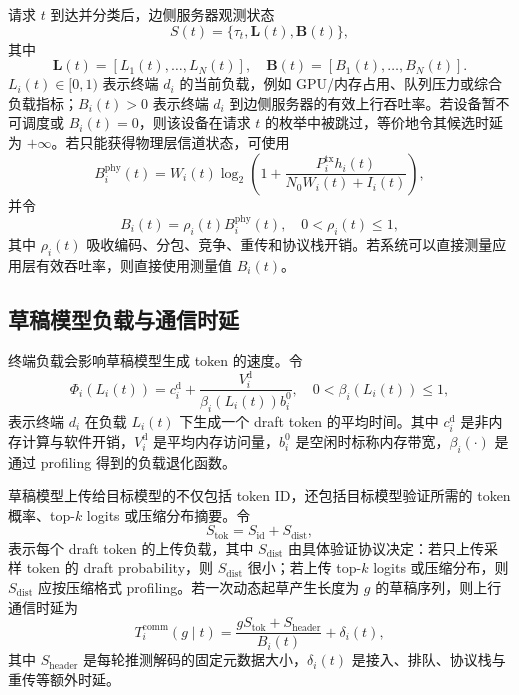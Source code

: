 \documentclass[11pt,a4paper]{ctexart}
\begin{document}
请求 $t$ 到达并分类后，边侧服务器观测状态
\begin{equation}
    S(t)=\{\tau_t,\mathbf{L}(t),\mathbf{B}(t)\},
\end{equation}
其中
\begin{equation}
    \mathbf{L}(t)=[L_1(t),\ldots,L_N(t)],
    \quad
    \mathbf{B}(t)=[B_1(t),\ldots,B_N(t)].
\end{equation}
$L_i(t)\in[0,1)$ 表示终端 $d_i$ 的当前负载，例如 GPU/内存占用、队列压力或综合负载指标；$B_i(t)>0$ 表示终端 $d_i$ 到边侧服务器的有效上行吞吐率。若设备暂不可调度或 $B_i(t)=0$，则该设备在请求 $t$ 的枚举中被跳过，等价地令其候选时延为 $+\infty$。若只能获得物理层信道状态，可使用
\begin{equation}
    B_i^{\mathrm{phy}}(t)
    =
    W_i(t)\log_2
    \left(
    1+
    \frac{P_i^{\mathrm{tx}}h_i(t)}
    {N_0W_i(t)+I_i(t)}
    \right),
\end{equation}
并令
\begin{equation}
    B_i(t)=\rho_i(t)B_i^{\mathrm{phy}}(t),
    \quad 0<\rho_i(t)\leq 1,
\end{equation}
其中 $\rho_i(t)$ 吸收编码、分包、竞争、重传和协议栈开销。若系统可以直接测量应用层有效吞吐率，则直接使用测量值 $B_i(t)$。

\subsection{草稿模型负载与通信时延}
\label{subsec:latency}

终端负载会影响草稿模型生成 token 的速度。令
\begin{equation}
    \Phi_i(L_i(t))
    =
    c_i^{\mathrm{d}}
    +
    \frac{V_i^{\mathrm{d}}}{\beta_i(L_i(t))b_i^0},
    \quad
    0<\beta_i(L_i(t))\leq 1,
    \label{eq:draft_token_latency}
\end{equation}
表示终端 $d_i$ 在负载 $L_i(t)$ 下生成一个 draft token 的平均时间。其中 $c_i^{\mathrm{d}}$ 是非内存计算与软件开销，$V_i^{\mathrm{d}}$ 是平均内存访问量，$b_i^0$ 是空闲时标称内存带宽，$\beta_i(\cdot)$ 是通过 profiling 得到的负载退化函数。

草稿模型上传给目标模型的不仅包括 token ID，还包括目标模型验证所需的 token 概率、top-$k$ logits 或压缩分布摘要。令
\begin{equation}
    S_{\mathrm{tok}}=S_{\mathrm{id}}+S_{\mathrm{dist}},
\end{equation}
表示每个 draft token 的上传负载，其中 $S_{\mathrm{dist}}$ 由具体验证协议决定：若只上传采样 token 的 draft probability，则 $S_{\mathrm{dist}}$ 很小；若上传 top-$k$ logits 或压缩分布，则 $S_{\mathrm{dist}}$ 应按压缩格式 profiling。若一次动态起草产生长度为 $g$ 的草稿序列，则上行通信时延为
\begin{equation}
    T_i^{\mathrm{comm}}(g\mid t)
    =
    \frac{gS_{\mathrm{tok}}+S_{\mathrm{header}}}{B_i(t)}
    +\delta_i(t),
    \label{eq:comm_latency}
\end{equation}
其中 $S_{\mathrm{header}}$ 是每轮推测解码的固定元数据大小，$\delta_i(t)$ 是接入、排队、协议栈与重传等额外时延。
\end{document}
